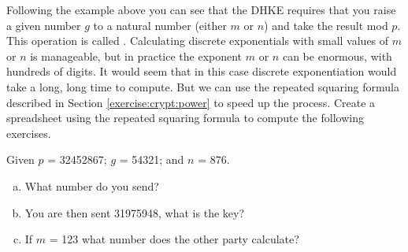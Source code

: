 


Following the example above you can see that the DHKE requires that you raise a given number $g$ to a natural number (either $m$ or $n$) and take the result mod $p$. This operation is called . Calculating discrete exponentials with small values of $m$ or $n$ is manageable, but in practice the exponent $m$ or $n$ can be enormous, with hundreds of digits. It would seem that in this case discrete exponentiation would take a long, long time to compute.  But we can use the repeated squaring formula described in Section \ref{exercise:crypt:power} to speed up the process.  Create a spreadsheet using the repeated squaring formula to compute the following exercises.
 
\begin{exer}
Given $p$ = 32452867; $g$ = 54321; and $n$ = 876.  
\begin{enumerate}[(a)]
\item What number do you send?  

\item You are then sent 31975948, what is the key? 

\item If $m$ = 123 what number does the other party calculate?
\end{enumerate}
\end{exer}


